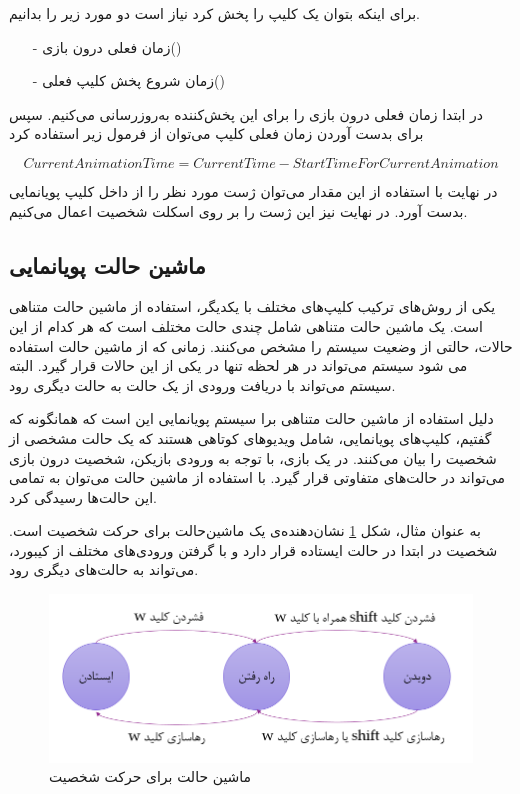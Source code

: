 برای اینکه بتوان یک کلیپ را پخش کرد نیاز است دو مورد زیر را بدانیم.

\begin{enumerate}
	\item[-] زمان فعلی درون بازی()
	\item[-] زمان شروع پخش کلیپ فعلی() 
\end{enumerate}

در ابتدا زمان فعلی درون بازی را برای این پخش‌کننده به‌روزرسانی می‌کنیم.
سپس برای بدست آوردن زمان فعلی کلیپ می‌توان از فرمول زیر استفاده کرد

\[CurrentAnimationTime = CurrentTime - StartTimeForCurrentAnimation\]

در نهایت با استفاده از این مقدار می‌توان ژست مورد نظر را از داخل کلیپ پویانمایی بدست ‌آورد.
در نهایت نیز این ژست را بر روی اسکلت شخصیت اعمال می‌کنیم.


\subsection{ماشین حالت پویانمایی}

یکی از روش‌های ترکیب کلیپ‌های مختلف با یکدیگر، استفاده از ماشین حالت متناهی است.
یک ماشین‌ حالت متناهی شامل چندی حالت مختلف است
که هر کدام از این حالات، حالتی از وضعیت سیستم را مشخص می‌کنند.
زمانی که از ماشین حالت استفاده می شود سیستم می‌تواند در هر لحظه تنها در یکی از این حالات قرار گیرد.
البته سیستم می‌تواند با دریافت ورودی از یک حالت به حالت دیگری رود.

دلیل استفاده از ماشین حالت متناهی برا سیستم پویانمایی این است که همانگونه که گفتیم، کلیپ‌های پویانمایی، شامل ویدیو‌های کوتاهی هستند که یک حالت مشخصی از شخصیت را بیان می‌کنند.
در یک بازی، با توجه به ورودی بازیکن، شخصیت درون بازی می‌تواند در حالت‌های متفاوتی قرار گیرد. با استفاده از ماشین حالت می‌توان به تمامی این حالت‌ها رسیدگی کرد.

به عنوان مثال، شکل 
\ref{fig:LocomotionStateMachine}
نشان‌دهنده‌ی یک ماشین‌حالت برای حرکت شخصیت است. شخصیت در ابتدا در حالت ایستاده قرار دارد و با گرفتن
ورودی‌های مختلف از کیبورد، می‌تواند به حالت‌های دیگری رود.

\begin{figure}[ht]
	\centerline{\includegraphics[width=\textwidth,height=\textheight,keepaspectratio]{Figures/Ch5/LocomotionStateMachine.png}}

	\caption{ماشین حالت برای حرکت شخصیت}
	\label{fig:LocomotionStateMachine}
\end{figure}


